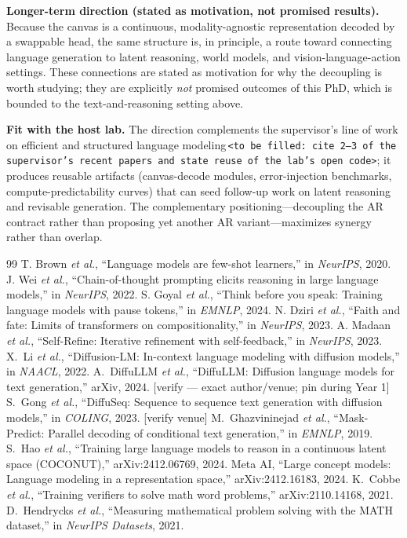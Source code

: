 \documentclass[11pt,a4paper]{article}
\begin{document}
\textbf{Longer-term direction (stated as motivation, not promised results).} Because the canvas is a continuous, modality-agnostic representation decoded by a swappable head, the same structure is, in principle, a route toward connecting language generation to latent reasoning, world models, and vision-language-action settings. These connections are stated as motivation for why the decoupling is worth studying; they are explicitly \emph{not} promised outcomes of this PhD, which is bounded to the text-and-reasoning setting above.

\textbf{Fit with the host lab.} The direction complements the supervisor's line of work on efficient and structured language modeling\,\texttt{<to be filled: cite 2--3 of the supervisor's recent papers and state reuse of the lab's open code>}; it produces reusable artifacts (canvas-decode modules, error-injection benchmarks, compute-predictability curves) that can seed follow-up work on latent reasoning and revisable generation. The complementary positioning---decoupling the AR contract rather than proposing yet another AR variant---maximizes synergy rather than overlap.

\begin{thebibliography}{99}
 T. Brown \emph{et al.}, ``Language models are few-shot learners,'' in \emph{NeurIPS}, 2020.
 J. Wei \emph{et al.}, ``Chain-of-thought prompting elicits reasoning in large language models,'' in \emph{NeurIPS}, 2022.
 S. Goyal \emph{et al.}, ``Think before you speak: Training language models with pause tokens,'' in \emph{EMNLP}, 2024.
 N. Dziri \emph{et al.}, ``Faith and fate: Limits of transformers on compositionality,'' in \emph{NeurIPS}, 2023.
 A. Madaan \emph{et al.}, ``Self-Refine: Iterative refinement with self-feedback,'' in \emph{NeurIPS}, 2023.
 X.~Li \emph{et al.}, ``Diffusion-LM: In-context language modeling with diffusion models,'' in \emph{NAACL}, 2022.
 A.~DiffuLLM \emph{et al.}, ``DiffuLLM: Diffusion language models for text generation,'' arXiv, 2024. [verify --- exact author/venue; pin during Year 1]
 S.~Gong \emph{et al.}, ``DiffuSeq: Sequence to sequence text generation with diffusion models,'' in \emph{COLING}, 2023. [verify venue]
 M.~Ghazvininejad \emph{et al.}, ``Mask-Predict: Parallel decoding of conditional text generation,'' in \emph{EMNLP}, 2019.
 S.~Hao \emph{et al.}, ``Training large language models to reason in a continuous latent space (COCONUT),'' arXiv:2412.06769, 2024.
 Meta AI, ``Large concept models: Language modeling in a representation space,'' arXiv:2412.16183, 2024.
 K.~Cobbe \emph{et al.}, ``Training verifiers to solve math word problems,'' arXiv:2110.14168, 2021.
 D.~Hendrycks \emph{et al.}, ``Measuring mathematical problem solving with the MATH dataset,'' in \emph{NeurIPS Datasets}, 2021.
\end{thebibliography}
\end{document}
